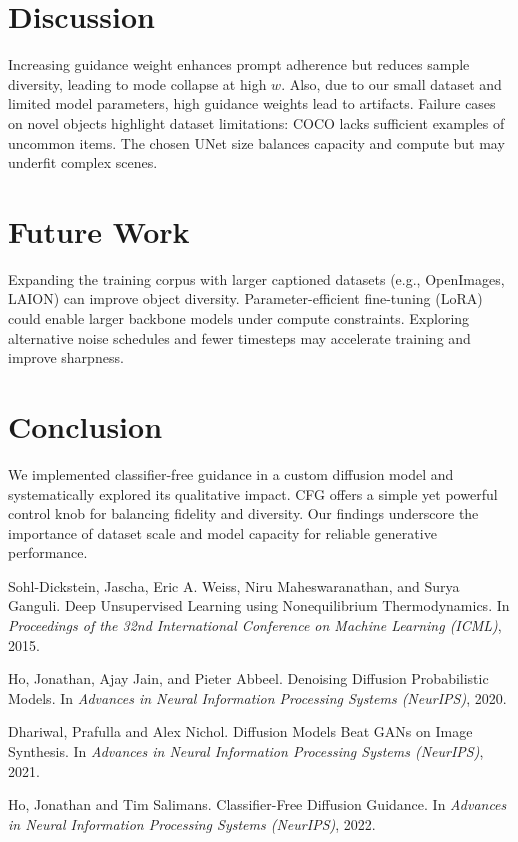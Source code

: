 \documentclass[11pt,a4paper]{article}
\begin{document}
\section{Discussion}
Increasing guidance weight enhances prompt adherence but reduces sample diversity, leading to mode collapse at high $w$. Also, due to our small dataset and limited model parameters, high guidance weights lead to artifacts. Failure cases on novel objects highlight dataset limitations: COCO lacks sufficient examples of uncommon items. The chosen UNet size balances capacity and compute but may underfit complex scenes.

\section{Future Work}
Expanding the training corpus with larger captioned datasets (e.g., OpenImages, LAION) can improve object diversity. Parameter-efficient fine-tuning (LoRA) could enable larger backbone models under compute constraints. Exploring alternative noise schedules and fewer timesteps may accelerate training and improve sharpness.

\section{Conclusion}
We implemented classifier-free guidance in a custom diffusion model and systematically explored its qualitative impact. CFG offers a simple yet powerful control knob for balancing fidelity and diversity. Our findings underscore the importance of dataset scale and model capacity for reliable generative performance.




\begin{thebibliography}{4}
    Sohl-Dickstein, Jascha, Eric A. Weiss, Niru Maheswaranathan, and Surya Ganguli.
    \newblock Deep Unsupervised Learning using Nonequilibrium Thermodynamics.
    \newblock In {\em Proceedings of the 32nd International Conference on Machine Learning (ICML)}, 2015.
    
    Ho, Jonathan, Ajay Jain, and Pieter Abbeel.
    \newblock Denoising Diffusion Probabilistic Models.
    \newblock In {\em Advances in Neural Information Processing Systems (NeurIPS)}, 2020.
    
    Dhariwal, Prafulla and Alex Nichol.
    \newblock Diffusion Models Beat GANs on Image Synthesis.
    \newblock In {\em Advances in Neural Information Processing Systems (NeurIPS)}, 2021.
    
    Ho, Jonathan and Tim Salimans.
    \newblock Classifier-Free Diffusion Guidance.
    \newblock In {\em Advances in Neural Information Processing Systems (NeurIPS)}, 2022.
    \end{thebibliography}
    
    
\end{document}
